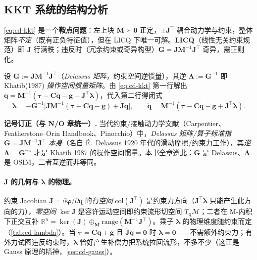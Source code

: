 \subsection{KKT 系统的结构分析}
\cref{eq:cd-kkt} 是一个\textbf{鞍点问题}：左上块 $\mathbf M\succ\mathbf 0$ 正定，$\pm\mathbf J^\top$ 耦合动力学与约束，整体矩阵\emph{不定}（既有正负特征值），但在 LICQ 下唯一可解。\textbf{LICQ}（线性无关约束规范）即 $\mathbf J$ 行满秩；违反时（冗余约束或奇异构型）$\mathbf G=\mathbf J\mathbf M^{-1}\mathbf J^\top$ 奇异，需正则化。

\begin{theorem}\label{thm:cd-schur}
设 $\mathbf G:=\mathbf J\mathbf M^{-1}\mathbf J^\top$（\emph{Delassus 矩阵}，约束空间逆惯量），其逆 $\boldsymbol\Lambda:=\mathbf G^{-1}$ 即 Khatib(1987) \emph{操作空间惯量矩阵}。由 \cref{eq:cd-kkt} 第一行解出 $\ddot{\mathbf q}=\mathbf M^{-1}(\boldsymbol\tau-\mathbf C\dot{\mathbf q}-\mathbf g+\mathbf J^\top\boldsymbol\lambda)$，代入第二行得闭式
\begin{equation}
  \boldsymbol\lambda=-\mathbf G^{-1}\big[\mathbf J\mathbf M^{-1}(\boldsymbol\tau-\mathbf C\dot{\mathbf q}-\mathbf g)+\dot{\mathbf J}\dot{\mathbf q}\big],\qquad \ddot{\mathbf q}=\mathbf M^{-1}(\boldsymbol\tau-\mathbf C\dot{\mathbf q}-\mathbf g+\mathbf J^\top\boldsymbol\lambda).
  \label{eq:cd-schur}
\end{equation}
\end{theorem}

\begin{note}
\textbf{记号订正（与 N/O 章统一）.}\;
当代约束/接触动力学文献（Carpentier、Featherstone--Orin Handbook、Pinocchio）中，\emph{Delassus 矩阵/算子标准指 $\mathbf G=\mathbf J\mathbf M^{-1}\mathbf J^\top$ 本身}（名自 É.~Delassus 1920 年代的滑动摩擦/约束力工作），其\emph{逆} $\boldsymbol\Lambda=\mathbf G^{-1}$ 才是 Khatib 1987 的操作空间惯量。本书全章遵此：$\mathbf G$ 是 Delassus、$\boldsymbol\Lambda$ 是 OSIM，二者互逆而非等同。
\end{note}

\paragraph{$\mathbf J$ 的几何与 $\boldsymbol\lambda$ 的物理。}
约束 Jacobian $\mathbf J=\partial\boldsymbol\varphi/\partial\mathbf q$ 的\emph{行空间} $\mathrm{col}(\mathbf J^\top)$ 是约束力方向（$\mathbf J^\top\boldsymbol\lambda$ 只能产生此方向的力），\emph{零空间} $\ker\mathbf J$ 是容许运动空间即约束流形切空间 $T_{\mathbf q}\mathcal M$；二者在 M-内积下正交互补 $\mathbb R^{n}=\ker(\mathbf J)\oplus_{\mathbf M}\mathrm{range}(\mathbf M^{-1}\mathbf J^\top)$。乘子 $\boldsymbol\lambda$ 的物理维度随约束而定（\cref{tab:cd-lambda}）。当 $\boldsymbol\tau=\mathbf C\dot{\mathbf q}+\mathbf g$ 且 $\dot{\mathbf J}\dot{\mathbf q}=\mathbf 0$ 时 $\boldsymbol\lambda=\mathbf 0$——不需额外约束力；有外力试图违反约束时，$\boldsymbol\lambda$ 恰好产生补偿力把系统拉回流形，不多不少（这正是 Gauss 原理的精神，\cref{sec:cd-gauss}）。

